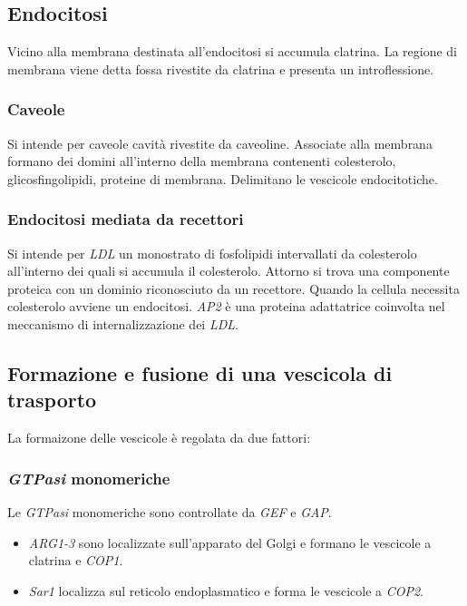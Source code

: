 	\subsection{Endocitosi}
	Vicino alla membrana destinata all'endocitosi si accumula clatrina.
	La regione di membrana viene detta fossa rivestite da clatrina e presenta un introflessione.

		\subsubsection{Caveole}
		Si intende per caveole cavit\`a rivestite da caveoline.
		Associate alla membrana formano dei domini all'interno della membrana contenenti colesterolo, glicosfingolipidi, proteine di membrana.
		Delimitano le vescicole endocitotiche.

		\subsubsection{Endocitosi mediata da recettori}
		Si intende per \emph{LDL} un monostrato di fosfolipidi intervallati da colesterolo all'interno dei quali si accumula il colesterolo.
		Attorno si trova una componente proteica con un dominio riconosciuto da un recettore.
		Quando la cellula necessita colesterolo avviene un endocitosi.
		\emph{AP2} \`e una proteina adattatrice coinvolta nel meccanismo di internalizzazione dei \emph{LDL}.

	\subsection{Formazione e fusione di una vescicola di trasporto}
	La formaizone delle vescicole \`e regolata da due fattori:
	
		\subsubsection{\emph{GTPasi} monomeriche}
		Le \emph{GTPasi} monomeriche sono controllate da \emph{GEF} e \emph{GAP}.
		\begin{multicols}{2}
			\begin{itemize}
				\item \emph{ARG1-3} sono localizzate sull'apparato del Golgi e formano le vescicole a clatrina e \emph{COP1}.
				\item \emph{Sar1} localizza sul reticolo endoplasmatico e forma le vescicole a \emph{COP2}.
			\end{itemize}
		\end{multicols}

